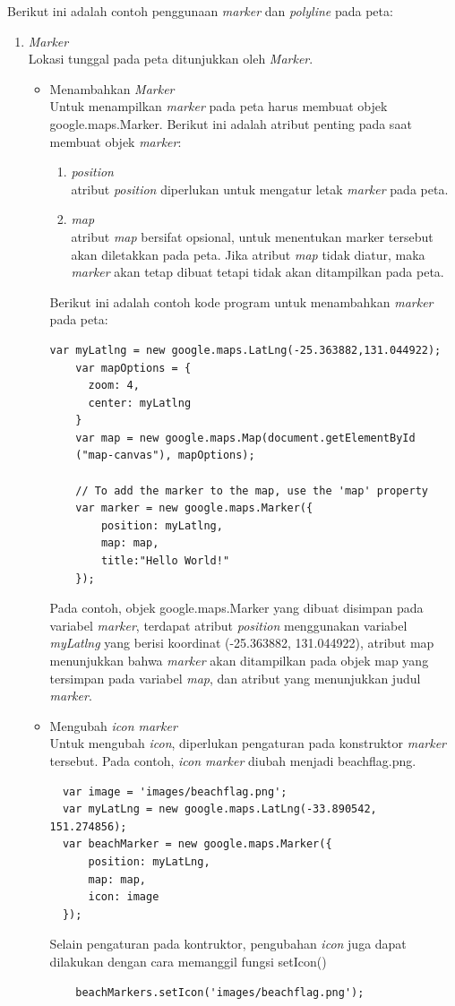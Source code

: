 Berikut ini adalah contoh penggunaan \textit{marker} dan \textit{polyline} pada
peta:
\begin{enumerate}
\item \textit{Marker} \\
Lokasi tunggal pada peta ditunjukkan oleh \textit{Marker}.
\begin{itemize}
  \item Menambahkan \textit{Marker} \\
  Untuk menampilkan \textit{marker} pada peta harus membuat objek
  google.maps.Marker. Berikut ini adalah atribut penting pada saat
  membuat objek \textit{marker}:
  \begin{enumerate}
    \item \textit{position} \\
    atribut \textit{position} diperlukan untuk mengatur letak \textit{marker}
    pada peta.
    
    \item \textit{map} \\
    atribut \textit{map} bersifat opsional, untuk menentukan marker
    tersebut akan diletakkan pada peta. Jika atribut \textit{map} tidak diatur,
    maka \textit{marker} akan tetap dibuat tetapi tidak akan ditampilkan pada
    peta.
  \end{enumerate}
  Berikut ini adalah contoh kode program untuk menambahkan \textit{marker} pada
  peta:
\begin{verbatim}
var myLatlng = new google.maps.LatLng(-25.363882,131.044922);
	var mapOptions = {
	  zoom: 4,
	  center: myLatlng
	}
	var map = new google.maps.Map(document.getElementById
	("map-canvas"), mapOptions);
	
	// To add the marker to the map, use the 'map' property
	var marker = new google.maps.Marker({
	    position: myLatlng,
	    map: map,
	    title:"Hello World!"
	});
\end{verbatim}
  Pada contoh, objek google.maps.Marker yang dibuat disimpan pada variabel
  \textit{marker}, terdapat atribut \textit{position} menggunakan variabel
  \textit{myLatlng} yang berisi koordinat (-25.363882, 131.044922), atribut map
  menunjukkan bahwa \textit{marker} akan ditampilkan pada objek map yang tersimpan pada variabel
  \textit{map}, dan atribut yang menunjukkan judul \textit{marker}. 
  
  \item Mengubah \textit{icon marker}\\
  Untuk mengubah \textit{icon}, diperlukan pengaturan pada konstruktor
  \textit{marker} tersebut. Pada contoh, \textit{icon marker} diubah
  menjadi beachflag.png.
\begin{verbatim}
  var image = 'images/beachflag.png';
  var myLatLng = new google.maps.LatLng(-33.890542, 151.274856);
  var beachMarker = new google.maps.Marker({
      position: myLatLng,
      map: map,
      icon: image
  });
\end{verbatim}
Selain pengaturan pada kontruktor, pengubahan \textit{icon} juga dapat dilakukan
dengan cara memanggil fungsi setIcon()
\begin{verbatim}
	beachMarkers.setIcon('images/beachflag.png');
\end{verbatim}


\end{itemize}
\end{enumerate}
